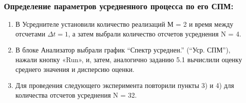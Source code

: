 \subsubsection[Задание 5.1]{Определение параметров усредненного процесса по его СПМ:}
\begin{enumerate}
	\item В Усреднителе установили количество реализаций М = 2 и время между отсчетами $\Delta t = 1$, а затем выбрали количество отсчетов усреднения N = 4.
	\item В блоке Анализатор выбрали график “Спектр усреднен.” (“Уср. СПМ”), нажали кнопку «Run», и, затем, аналогично заданию 5.1 вычислили оценку среднего значения и дисперсию оценки.
	\item Для проведения следующего эксперимента повторили пункты 3) и 4) для количества отсчетов усреднения N = 32.
\end{enumerate}
